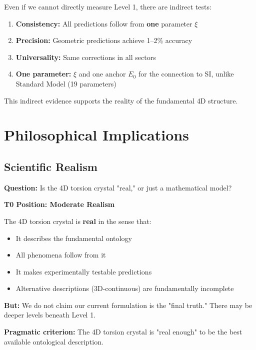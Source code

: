 	Even if we cannot directly measure Level 1, there are indirect tests:
	
	\begin{enumerate}
		\item \textbf{Consistency:} All predictions follow from \textbf{one} parameter $\xi$
		\item \textbf{Precision:} Geometric predictions achieve 1--2\% accuracy
		\item \textbf{Universality:} Same corrections in all sectors
		\item \textbf{One parameter:} $\xi$ and one anchor $E_0$ for the connection to SI, unlike Standard Model (19 parameters)
	\end{enumerate}
	
	This indirect evidence supports the reality of the fundamental 4D structure.
	
	\section{Philosophical Implications}
	
	\subsection{Scientific Realism}
	
	\begin{philosophical}
		\textbf{Question:} Is the 4D torsion crystal "real," or just a mathematical model?
		
		\vspace{0.3cm}
		
		\textbf{T0 Position: Moderate Realism}
		
		The 4D torsion crystal is \textbf{real} in the sense that:
		\begin{itemize}
			\item It describes the fundamental ontology
			\item All phenomena follow from it
			\item It makes experimentally testable predictions
			\item Alternative descriptions (3D-continuous) are fundamentally incomplete
		\end{itemize}
		
		\vspace{0.3cm}
		
		\textbf{But:}
		We do not claim our current formulation is the "final truth." There may be deeper levels beneath Level 1.
		
		\vspace{0.3cm}
		
		\textbf{Pragmatic criterion:}
		The 4D torsion crystal is "real enough" to be the best available ontological description.
	\end{philosophical}
	
